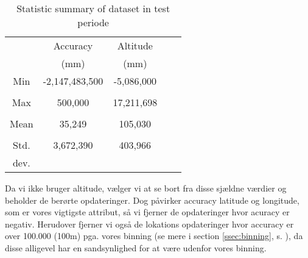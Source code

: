 \begin{table}[H]
        \centering
        \small
        \setlength\tabcolsep{2pt}
        \begin{tabular}{|c|c|c|c|c|}
            \hline
                         & Accuracy           & Altitude     \\[-3pt]%
                         &  (mm)              & (mm)              \\
            \hline
                 Min     &  -2,147,483,500    & -5,086,000            \\
                         &                    &                    \\
            \hline
                 Max     &  500,000           & 17,211,698        \\
                         &                    &                      \\
            \hline
                 Mean    & 35,249             & 105,030               \\
                         &                    &                   \\
            \hline
                 Std.    & 3,672,390          & 403,966            \\
                 dev.    &                    &                   \\
            \hline
        \end{tabular}
        \caption{Statistic summary of dataset in test periode} %
        \label{tab:stat_geo_p1}
\end{table}



Da vi ikke bruger altitude, vælger vi at se bort fra disse sjældne værdier og beholder de berørte opdateringer. Dog påvirker accuracy latitude og longitude, som er vores vigtigste attribut, så vi fjerner de opdateringer hvor acuracy er negativ. Herudover fjerner vi også de lokations opdateringer hvor accuracy er over 100.000 (100m) pga. vores binning (se mere i section \ref{ssec:binning}, s. \pageref{ssec:binning}), da disse alligevel har en sandsynlighed for at være udenfor vores binning. 

